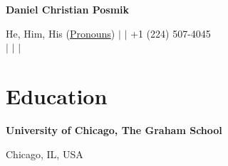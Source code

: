 
\begin{center}
	\textbf{{\LARGE \color{black} Daniel Christian Posmik}}
\end{center}
\vspace{2pt}

\begin{center}
    \faInfo
    \thinspace \thinspace
    He, Him, His (\href{https://inclusion.uchicago.edu/lgbtq-student-life/lgbtq-resources/#collapse4}{Pronouns}) $|$
    \href{mailto:posmikdc@uchicago.edu}{
    \faEnvelope
    \thinspace \thinspace
    } $|$
    \faPhone
    \thinspace \thinspace
    +1 (224) 507-4045 \\
    \vspace{2pt}
    \href{https://posmikdc.github.io/}{
    \faGithub
    \thinspace \thinspace
    } $|$
    \href{https://www.linkedin.com/in/posmikdc/}{
    \faLinkedin
    \thinspace \thinspace        
    } $|$
    \href{https://twitter.com/posmikdc}{
    \faTwitter
    \thinspace \thinspace        
    } $|$
    \href{https://scholar.google.com/citations?hl=en&user=sRuEm5oAAAAJ}{
    \faGraduationCap
    \thinspace \thinspace
    }
\end{center}

\vspace{1pt}

\section{Education}
    \begin{minipage}{.75\linewidth} \begin{flushleft}
    		\textbf{University of Chicago, The Graham School}
    	\end{flushleft} \end{minipage}
    \hfill 
    \begin{minipage}{.20\linewidth}\begin{flushright}
    	 Chicago, IL, USA
    	\end{flushright}\end{minipage}
    	

